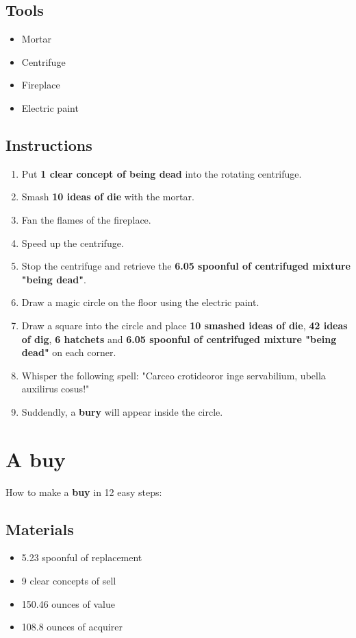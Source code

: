 \documentclass{article}
\begin{document}
\subsection{Tools}\begin{itemize}
\item 
Mortar
\item 
Centrifuge
\item 
Fireplace
\item 
Electric paint
\end{itemize}
\subsection{Instructions}\begin{enumerate}
\item 
Put \textbf{1 clear concept of being dead} into the rotating centrifuge.
\item 
Smash \textbf{10 ideas of die} with the mortar.
\item 
Fan the flames of the fireplace.
\item 
Speed up the centrifuge.
\item 
Stop the centrifuge and retrieve the \textbf{6.05 spoonful of centrifuged mixture "being dead"}.
\item 
Draw a magic circle on the floor using the electric paint.
\item 
Draw a square into the circle and place \textbf{10 smashed ideas of die}, \textbf{42 ideas of dig}, \textbf{6 hatchets} and \textbf{6.05 spoonful of centrifuged mixture "being dead"} on each corner.
\item 
Whisper the following spell: "Carceo crotideoror inge servabilium, ubella auxilirus cosus!"
\item 
Suddendly, a \textbf{bury} will appear inside the circle.
\end{enumerate}
\newpage
\section{A buy}How to make a \textbf{buy} in 12 easy steps:

\subsection{Materials}\begin{itemize}
\item 
5.23 spoonful of replacement
\item 
9 clear concepts of sell
\item 
150.46 ounces of value
\item 
108.8 ounces of acquirer
\end{itemize}
\end{document}
